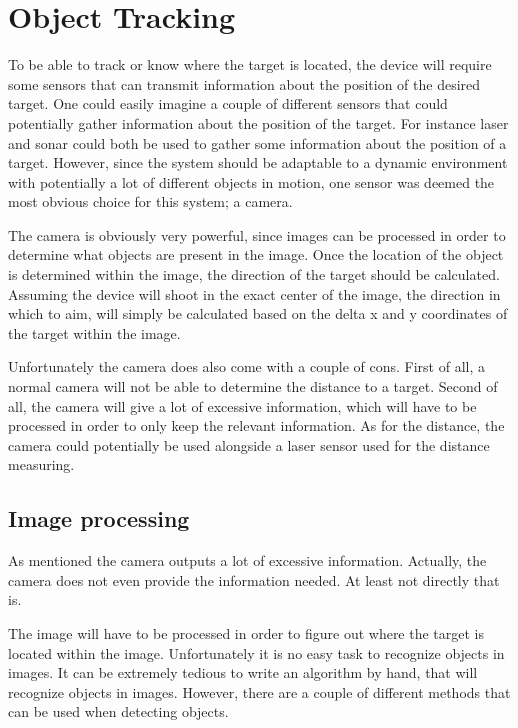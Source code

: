 \section{Object Tracking}

To be able to track or know where the target is located, the device will require some sensors that can transmit information about the position of the desired target.
One could easily imagine a couple of different sensors that could potentially gather information about the position of the target.
For instance laser and sonar could both be used to gather some information about the position of a target\cite{Sensors}.
However, since the system should be adaptable to a dynamic environment with potentially a lot of different objects in motion, one sensor was deemed the most obvious choice for this system; a camera.

The camera is obviously very powerful, since images can be processed in order to determine what objects are present in the image.
Once the location of the object is determined within the image, the direction of the target should be calculated.
Assuming the device will shoot in the exact center of the image, the direction in which to aim, will simply be calculated based on the delta x and y coordinates of the target within the image.

Unfortunately the camera does also come with a couple of cons.
First of all, a normal camera will not be able to determine the distance to a target.
Second of all, the camera will give a lot of excessive information, which will have to be processed in order to only keep the relevant information.
As for the distance, the camera could potentially be used alongside a laser sensor used for the distance measuring\cite{Sensors}.

\subsection{Image processing}
As mentioned the camera outputs a lot of excessive information.
Actually, the camera does not even provide the information needed.
At least not directly that is.

The image will have to be processed in order to figure out where the target is located within the image.
Unfortunately it is no easy task to recognize objects in images.
It can be extremely tedious to write an algorithm by hand, that will recognize objects in images.
However, there are a couple of different methods that can be used when detecting objects.

